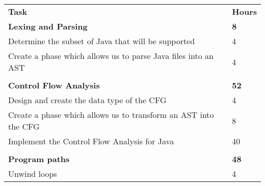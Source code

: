 \documentclass[a4paper]{article}
\begin{document}
\begin{table}[H]
    \label{table:schedule}
    \begin{tabular}{ll}
    \textbf{Task}                                                                                                                                       & \textbf{Hours}  \\
    \textbf{Lexing and Parsing}                                                                                                                         & \textbf{8}      \\
    Determine the subset of Java that will be supported                                                                                                 & 4               \\
    Create a phase which allows us to parse Java files into an AST                                                                                      & 4               \\
                                                                                                                                                        &                 \\
    \textbf{Control Flow Analysis}                                                                                                                      & \textbf{52}     \\
    Design and create the data type of the CFG                                                                                                          & 4               \\
    Create a phase which allows us to transform an AST into the CFG                                                                                     & 8               \\
    Implement the Control Flow Analysis for Java                                                                                                        & 40              \\
                                                                                                                                                        &                 \\
    \textbf{Program paths}                                                                                                                              & \textbf{48}     \\
    Unwind loops                                                                                                                                        & 4               \\

\end{tabular}
\end{table}
\end{document}

